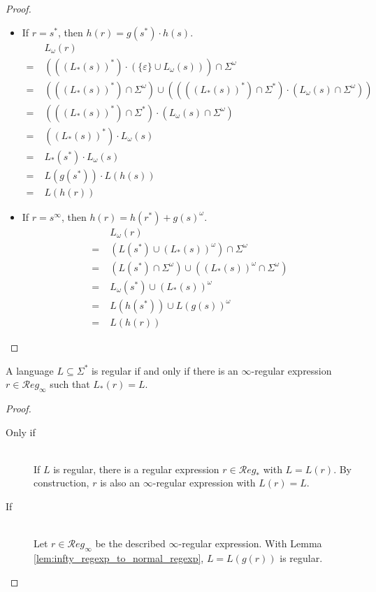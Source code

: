 \begin{proof}
\begin{itemize}
		\item If $r = s^*$, then $h(r) = g(s^*) \cdot h(s)$. \\
		\begin{align*}
			& L_\omega(r) \\
			=\;& (((L_*(s))^*) \cdot (\{\varepsilon\} \cup L_\omega(s))) \cap \Sigma^\omega \\
			=\;& (((L_*(s))^*) \cap \Sigma^\omega) \cup ((((L_*(s))^*) \cap \Sigma^*) \cdot (L_\omega(s) \cap \Sigma^\omega)) \\
			=\;& (((L_*(s))^*) \cap \Sigma^*) \cdot (L_\omega(s) \cap \Sigma^\omega) \\
			=\;& ((L_*(s))^*) \cdot L_\omega(s) \\
			=\;& L_*(s^*) \cdot L_\omega(s) \\
			=\;& L(g(s^*)) \cdot L(h(s)) \\
			=\;& L(h(r))
		\end{align*}
		
		\item If $r = s^\infty$, then $h(r) = h(r^*) + g(s)^\omega$. \\
		\begin{align*}
			& L_\omega(r) \\
			=\;& (L(s^*) \cup (L_*(s))^\omega) \cap \Sigma^\omega \\
			=\;& (L(s^*) \cap \Sigma^\omega) \cup ((L_*(s))^\omega \cap \Sigma^\omega) \\
			=\;& L_\omega(s^*) \cup (L_*(s))^\omega \\
			=\;& L(h(s^*)) \cup L(g(s))^\omega \\
			=\;& L(h(r))
		\end{align*}
	\end{itemize}
\end{proof}


\begin{prop}
	A language $L \subseteq \Sigma^*$ is regular if and only if there is an $\infty$-regular expression $r \in \mathcal{R}eg_\infty$ such that $L_*(r) = L$.
\end{prop}

\begin{proof}
	\begin{description}
	\item[Only if] \hfill \\
		If $L$ is regular, there is a regular expression $r \in \mathcal{R}eg_*$ with $L = L(r)$. By construction, $r$ is also an $\infty$-regular expression with $L(r) = L$.
		
	\item[If] \hfill \\
		Let $r \in \mathcal{R}eg_\infty$ be the described $\infty$-regular expression. With Lemma \ref{lem:infty_regexp_to_normal_regexp}, $L = L(g(r))$ is regular.
	\end{description}
\end{proof}


